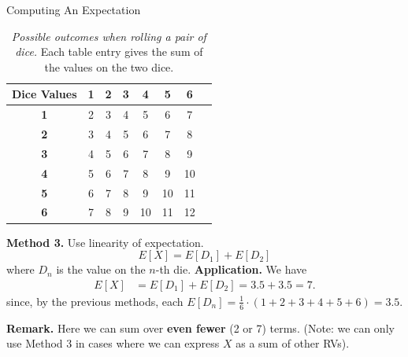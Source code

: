 \documentclass[10pt]{beamer}
\begin{document}
\begin{frame}{Computing An Expectation}
\footnotesize  
\begin{table}
\caption{\textit{Possible outcomes when rolling a pair of dice.} Each table entry gives the sum of the values on the two dice.}	
\begin{tabular}{|c|c|c|c|c|c|c|c|}
\hline
\textbf{Dice Values} & \textbf{1} & \textbf{2} & \textbf{3} & \textbf{4} & \textbf{5} & \textbf{6} \\
\hline
\textbf{1} & \cellcolor{red!20} 2  & \cellcolor{red!40} 3  & \cellcolor{red!60} 4  & \cellcolor{red!80} 5  & \cellcolor{red!90} 6  & \cellcolor{red!100} 7 \\
\hline
\textbf{2} & \cellcolor{red!40} 3  & \cellcolor{red!60} 4  & \cellcolor{red!80} 5  & \cellcolor{red!90} 6  & \cellcolor{red!100} 7  & \cellcolor{orange!80} 8 \\
\hline
\textbf{3} & \cellcolor{red!60} 4  & \cellcolor{red!80} 5  & \cellcolor{red!90} 6  & \cellcolor{red!100} 7  & \cellcolor{orange!80} 8  & \cellcolor{orange!60} 9 \\
\hline
\textbf{4} & \cellcolor{red!80} 5  & \cellcolor{red!90} 6  & \cellcolor{red!100} 7  & \cellcolor{orange!80} 8  & \cellcolor{orange!60} 9  & \cellcolor{orange!40} 10 \\
\hline
\textbf{5} & \cellcolor{red!90} 6  & \cellcolor{red!100} 7  & \cellcolor{orange!80} 8  & \cellcolor{orange!60} 9  & \cellcolor{orange!40} 10 & \cellcolor{orange!20} 11 \\
\hline
\textbf{6} & \cellcolor{red!100} 7 & \cellcolor{orange!80} 8 & \cellcolor{orange!60} 9 & \cellcolor{orange!40} 10 & \cellcolor{orange!20} 11 & \cellcolor{yellow!20} 12 \\
\hline
\end{tabular}
\end{table}

\vfill 
\colorbox{blue!30}{\textbf{Method 3.}} \; Use linearity of expectation.
\[ E[X] = E[D_1] + E[D_2] \]
where $D_n$ is the value on the $n$-th die.
\vfill 
\pause 
\colorbox{blue!30}{\textbf{Application.}} We have 
\begin{align*}
 E[X] &= E[D_1] + E[D_2] = 3.5 + 3.5 = 7.
\end{align*}
%
since, by the previous methods, each $E[D_n] = \frac{1}{6} \cdot  (1+2+3+4+5+6) = 3.5$.

\vfill 
\pause 
\colorbox{blue!30}{\textbf{Remark.}} \; Here we can sum over \textbf{even fewer} (2 or 7) terms.   (Note: we can only use Method 3 in cases where we can express $X$ as a sum of other RVs).
\end{frame}
\end{document}
